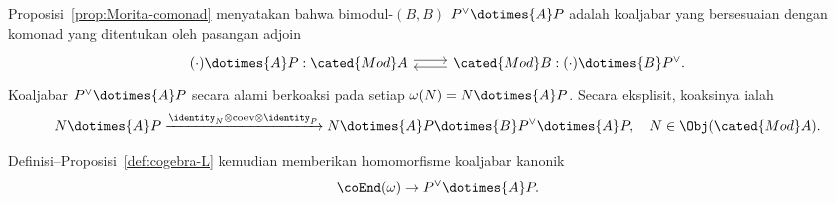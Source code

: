 Proposisi~\ref{prop:Morita-comonad} menyatakan bahwa bimodul-$(B,B)$
$P^\vee\dotimes{A}P$ adalah koaljabar yang bersesuaian dengan komonad yang
ditentukan oleh pasangan adjoin
\begin{equation*}\begin{tikzcd}
	(\cdot) \dotimes{A} P : \cated{Mod}A \arrow[shift left, r] & \cated{Mod}B: (\cdot) \dotimes{B} P^\vee \arrow[shift left, l].
\end{tikzcd}\end{equation*}
Koaljabar $P^\vee\dotimes{A}P$ secara alami berkoaksi pada setiap
$\omega(N)=N\dotimes{A}P$. Secara eksplisit, koaksinya ialah
\[ N \dotimes{A} P \xrightarrow{\identity_N \otimes \mathrm{coev} \otimes \identity_P} N \dotimes{A} P \dotimes{B} P^\vee \dotimes{A} P, \quad N \in \Obj(\cated{Mod}A). \]

Definisi--Proposisi~\ref{def:cogebra-L} kemudian memberikan homomorfisme
koaljabar kanonik
\[ \coEnd(\omega) \to P^\vee \dotimes{A} P. \]


